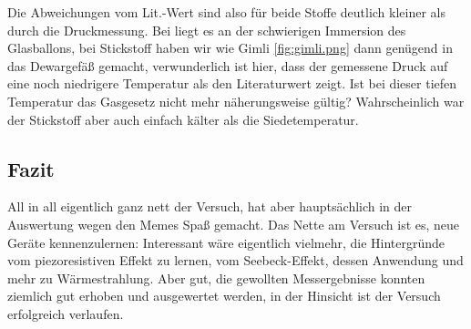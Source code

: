 Die Abweichungen vom Lit.-Wert sind also für beide Stoffe deutlich kleiner als durch die Druckmessung. Bei  liegt es an der schwierigen Immersion des Glasballons, bei Stickstoff haben wir wie Gimli \cref{fig:gimli.png} dann genügend  in das Dewargefäß gemacht, verwunderlich ist hier, dass der gemessene Druck auf eine noch niedrigere Temperatur als den Literaturwert zeigt. Ist bei dieser tiefen Temperatur das Gasgesetz nicht mehr näherungsweise gültig? Wahrscheinlich war der Stickstoff aber auch einfach kälter als die Siedetemperatur.


\subsection{Fazit}
All in all eigentlich ganz nett der Versuch, hat aber hauptsächlich in der Auswertung wegen den Memes Spaß gemacht. Das Nette am Versuch ist es, neue Geräte kennenzulernen: Interessant wäre eigentlich vielmehr, die Hintergründe vom piezoresistiven Effekt zu lernen, vom Seebeck-Effekt, dessen Anwendung und mehr zu Wärmestrahlung. Aber gut, die gewollten Messergebnisse konnten ziemlich gut erhoben und ausgewertet werden, in der Hinsicht ist der Versuch erfolgreich verlaufen.
